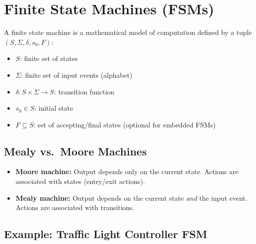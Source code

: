 \section{Finite State Machines (FSMs)}
\label{sec:mod:fsm}

\begin{definition}
A finite state machine is a mathematical model of computation defined by a tuple $(S, \Sigma, \delta, s_0, F)$:
\begin{itemize}[nosep]
  \item $S$: finite set of states
  \item $\Sigma$: finite set of input events (alphabet)
  \item $\delta: S \times \Sigma \to S$: transition function
  \item $s_0 \in S$: initial state
  \item $F \subseteq S$: set of accepting/final states (optional for embedded FSMs)
\end{itemize}
\end{definition}

\subsection{Mealy vs.\ Moore Machines}

\begin{itemize}
  \item \textbf{Moore machine:} Output depends only on the current state. Actions are associated with states (entry/exit actions).
  \item \textbf{Mealy machine:} Output depends on the current state \emph{and} the input event. Actions are associated with transitions.
\end{itemize}

\subsection{Example: Traffic Light Controller FSM}

